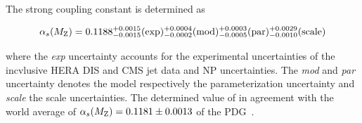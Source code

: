 The strong coupling constant \asmz is determined as

\begin{equation*}
  \alpha_{s}(M_\mathrm{Z}) = 0.1188_{-0.0015}^{+0.0015}(\mathrm{exp})_{-0.0002}^{+0.0004}(\mathrm{mod})_{-0.0005}^{+0.0003}(\mathrm{par})_{-0.0010}^{+0.0029}(\mathrm{scale})
\end{equation*}

where the \emph{exp} uncertainty accounts for the experimental uncertainties of
the incvlusive HERA DIS and CMS jet data and NP uncertainties. The \emph{mod}
and \emph{par} uncertainty denotes the model respectively the parameterization
uncertainty and \emph{scale} the scale uncertainties.  The determined value of
\asmz in agreement with the world average of $\alpha_{s}(M_\mathrm{Z})=0.1181\pm 0.0013$ of the
PDG~\cite{Agashe:2014kda}.
